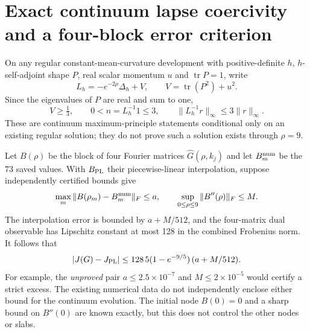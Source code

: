 \documentclass[11pt,a4paper]{article}
\theoremstyle{remark}
\begin{document}
\section{Exact continuum lapse coercivity and a four-block error criterion}
On any regular constant-mean-curvature development with positive-definite $h$, $h$-self-adjoint shape $P$, real scalar momentum $u$ and $\operatorname{tr}P=1$, write
\[
L_h=-e^{-2\rho}\Delta_h+V,
\qquad V=\operatorname{tr}(P^2)+u^2.
\]
Since the eigenvalues of $P$ are real and sum to one,
\begin{equation}\label{eq:lapse-third}
V\ge\tfrac13,
\qquad 0<n=L_h^{-1}1\le3,
\qquad \|L_h^{-1}r\|_\infty\le3\|r\|_\infty.
\end{equation}
These are continuum maximum-principle statements conditional only on an existing regular solution; they do not prove such a solution exists through $\rho=9$.

Let $B(\rho)$ be the block of four Fourier matrices $\widehat{G}(\rho,k_j)$ and let $B_m^{\rm num}$ be the 73 saved values. With $B_{\rm PL}$ their piecewise-linear interpolation, suppose independently certified bounds give
\[
\max_m\|B(\rho_m)-B_m^{\rm num}\|_F\le a,
\qquad\sup_{0\le\rho\le9}\|B''(\rho)\|_F\le M.
\]
The interpolation error is bounded by $a+M/512$, and the four-matrix dual observable has Lipschitz constant at most 128 in the combined Frobenius norm. It follows that
\begin{equation}\label{eq:nodecriterion}
|J(G)-J_{\rm PL}|
\le128\,5(1-e^{-9/5})\,(a+M/512).
\end{equation}
For example, the \emph{unproved} pair $a\le2.5\times10^{-7}$ and $M\le2\times10^{-5}$ would certify a strict excess. The existing numerical data do not independently enclose either bound for the continuum evolution. The initial node $B(0)=0$ and a sharp bound on $B''(0)$ are known exactly, but this does not control the other nodes or slabs.
\end{document}
